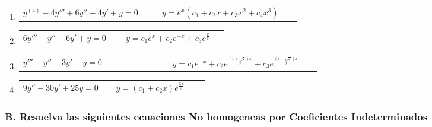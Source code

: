 \documentclass[a4paper,12pt]{article}
\begin{document}
\begin{enumerate}
    \item
    \begin{tabularx}{\linewidth}{L{0.45\linewidth} R{0.45\linewidth}}
    \( y^{(4)} - 4 y''' + 6 y'' - 4 y' + y = 0 \) & \(\displaystyle y = e^x (c_1 + c_2 x + c_3 x^2 + c_4 x^3) \)
    \end{tabularx}
    
    \item
    \begin{tabularx}{\linewidth}{L{0.45\linewidth} R{0.45\linewidth}}
    \( 6 y''' - y'' - 6 y' + y = 0 \) & \(\displaystyle y = c_1 e^x + c_2 e^{-x} + c_3 e^{\frac{x}{6}} \)
    \end{tabularx}
    
    \item
    \begin{tabularx}{\linewidth}{L{0.45\linewidth} R{0.45\linewidth}}
    \( y''' - y'' - 3 y' - y = 0 \) & \(\displaystyle y = c_1 e^{-x} + c_2 e^{\frac{(1+\sqrt{2})x}{2}} + c_3 e^{\frac{(1-\sqrt{2})x}{2}} \)
    \end{tabularx}

    \item
    \begin{tabularx}{\linewidth}{L{0.45\linewidth} R{0.45\linewidth}}
    \( 9y'' - 30y' + 25y = 0 \) & \(\displaystyle y = (c_1 + c_2 x) e^{\frac{5x}{3}} \)
    \end{tabularx}
    
\end{enumerate}

\subsubsection*{B. Resuelva las siguientes ecuaciones No homogeneas por Coeficientes Indeterminados}
\end{document}
